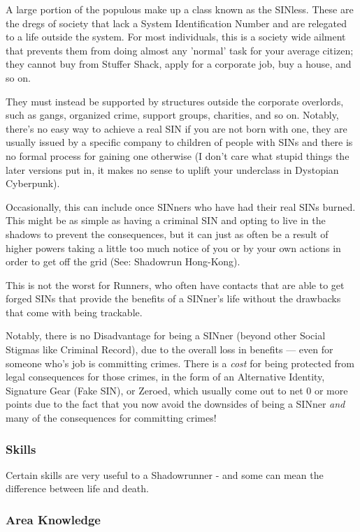 \begin{multicols}{3}
	A large portion of the populous make up a class known as the SINless. These are the dregs of society that lack a System Identification Number and are relegated to a life outside the system. For most individuals, this is a society wide ailment that prevents them from doing almost any 'normal' task for your average citizen; they cannot buy from Stuffer Shack, apply for a corporate job, buy a house, and so on. 
	
	They must instead be supported by structures outside the corporate overlords, such as gangs, organized crime, support groups, charities, and so on. Notably, there's no easy way to achieve a real SIN if you are not born with one, they are usually issued by a specific company to children of people with SINs and there is no formal process for gaining one otherwise (I don't care what stupid things the later versions put in, it makes no sense to uplift your underclass in Dystopian Cyberpunk).
	
	Occasionally, this can include once SINners who have had their real SINs burned. This might be as simple as having a criminal SIN and opting to live in the shadows to prevent the consequences, but it can just as often be a result of higher powers taking a little too much notice of you or by your own actions in order to get off the grid (See: Shadowrun Hong-Kong).
	
	This is not the worst for Runners, who often have contacts that are able to get forged SINs that provide the benefits of a SINner's life without the drawbacks that come with being trackable.
	
	Notably, there is no Disadvantage for being a SINner (beyond other Social Stigmas like Criminal Record), due to the overall loss in benefits — even for someone who's job is committing crimes. There is a \textit{cost} for being protected from legal consequences for those crimes, in the form of an Alternative Identity, Signature Gear (Fake SIN), or Zeroed, which usually come out to net 0 or more points due to the fact that you now avoid the downsides of being a SINner \textit{and} many of the consequences for committing crimes!
	
	\subsubsection{Skills}
	
	Certain skills are very useful to a Shadowrunner - and some can mean the difference between life and death.
	
	\subsubsection*{Area Knowledge}
	

\end{multicols}
